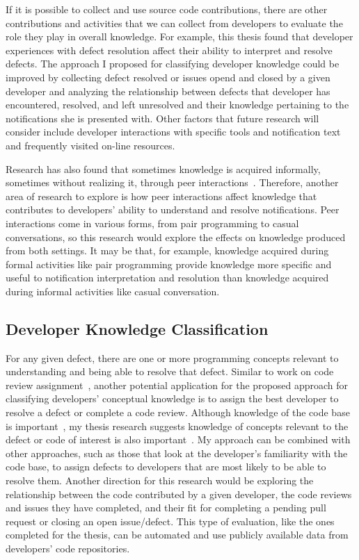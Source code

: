 If it is possible to collect and use source code contributions, there are other contributions and activities that we can collect from developers to evaluate the role they play in overall knowledge. For example, this thesis found that developer experiences with defect resolution affect their ability to interpret and resolve defects. The approach I proposed for classifying developer knowledge could be improved by collecting defect resolved or issues opend and closed by a given developer and analyzing the relationship between defects that developer has encountered, resolved, and left unresolved and their knowledge pertaining to the notifications she is presented with.
Other factors that future research will consider include developer interactions with specific tools and notification text and frequently visited on-line resources.

Research has also found that sometimes knowledge is acquired informally, sometimes without realizing it, through peer interactions~\cite{forman1989role,ge2003scaffolding,murphy2011peer}.
Therefore, another area of research to explore is how peer interactions affect knowledge that contributes to developers' ability to understand and resolve notifications. Peer interactions come in various forms, from pair programming to casual conversations, so this research would explore the effects on knowledge produced from both settings. It may be that, for example, knowledge acquired during formal activities like pair programming provide knowledge more specific and useful to notification interpretation and resolution than knowledge acquired during informal activities like casual conversation.

\subsection{Developer Knowledge Classification}

For any given defect, there are one or more programming concepts relevant to understanding and being able to resolve that defect. Similar to work on code review assignment~\cite{balachandran2013reducing}, another potential application for the proposed approach for classifying developers' conceptual knowledge is to assign the best developer to resolve a defect or complete a code review. 
Although knowledge of the code base is important~\cite{fritz2010degree}, my thesis research suggests knowledge of concepts relevant to the defect or code of interest is also important~\cite{johnson2016cross}. My approach can be combined with other approaches, such as those that look at the developer's familiarity with the code base, to assign defects to developers that are most likely to be able to resolve them.
Another direction for this research would be exploring the relationship between the code contributed by a given developer, the code reviews and issues they have completed, and their fit for completing a pending pull request or closing an open issue/defect. This type of evaluation, like the ones completed for the thesis, can be automated and use publicly available data from developers' code repositories.

